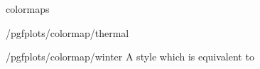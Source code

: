\begin{pgfplotslibrary}{colormaps}
\begin{stylekey}{/pgfplots/colormap/thermal}

	\matlabcolormaptext
\end{stylekey}

\begin{stylekey}{/pgfplots/colormap/winter}
	A style which is equivalent to 
\begin{codeexample}
\end{codeexample}


	\matlabcolormaptext
\end{stylekey}

\end{pgfplotslibrary}

